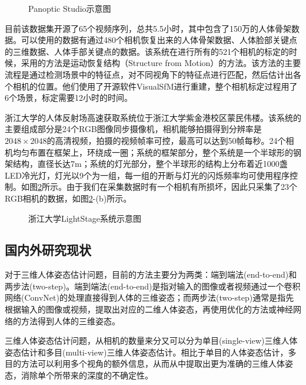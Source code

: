 \begin{figure}[ht] \centering
    \caption{\label{fig:panoptic} Panoptic Studio示意图\cite{Panoptic}}
\end{figure} 

目前该数据集开源了65个视频序列，总共5.5小时，其中包含了150万的人体骨架数据。可以使用的数据有通过480个相机恢复出来的人体骨架数据、人体脸部关键点的三维数据、人体手部关键点的数据。该系统在进行所有的521个相机的标定的时候，采用的方法是运动恢复结构（Structure from Motion）的方法。该方法的主要流程是通过检测场景中的特征点，对不同视角下的特征点进行匹配，然后估计出各个相机的位置。他们使用了开源软件VisualSfM进行重建，整个相机标定过程用了6个场景，标定需要12小时的时间。

浙江大学的人体反射场高速获取系统位于浙江大学紫金港校区蒙民伟楼。该系统的主要组成部分是24个RGB图像同步摄像机，相机能够拍摄得到分辨率是\(2048\times 2048\)的高清视频，拍摄的视频帧率可控，最高可以达到50帧每秒。24个相机均匀布置在框架上，环绕成一圈；系统的框架部分，整个系统是一个半球形的钢架结构，直径长达7m；系统的灯光部分，整个半球形的结构上分布着近1000盏LED冷光灯，灯光以9个为一组，每一组的开断与灯光的闪烁频率均可使用程序控制。如图\ref{fig:lightstage}所示。由于我们在采集数据时有一个相机有所损坏，因此只采集了23个RGB相机的数据，如图\ref{fig:lightstage}-(b)所示。
\begin{figure}[ht] \centering
    \caption{\label{fig:lightstage}浙江大学LightStage系统示意图}
\end{figure} 

\subsection{国内外研究现状}

对于三维人体姿态估计问题，目前的方法主要分为两类：端到端法(end-to-end)\cite{pavlakos2017coarse}和两步法(two-step)\cite{zhou2016sparseness}。端到端法(end-to-end)\cite{pavlakos2017coarse}是指对输入的图像或者视频通过一个卷积网络(ConvNet)的处理直接得到人体的三维姿态；而两步法(two-step)\cite{zhou2016sparseness}通常是指先根据输入的图像或视频，提取出对应的二维人体姿态，再使用优化的方法或神经网络的方法得到人体的三维姿态。

三维人体姿态估计问题，从相机的数量来分又可以分为单目(single-view)三维人体姿态估计和多目(multi-view)三维人体姿态估计。相比于单目的人体姿态估计，多目的方法可以利用多个视角的额外信息，从而从中提取出更为准确的三维人体姿态，消除单个所带来的深度的不确定性。

